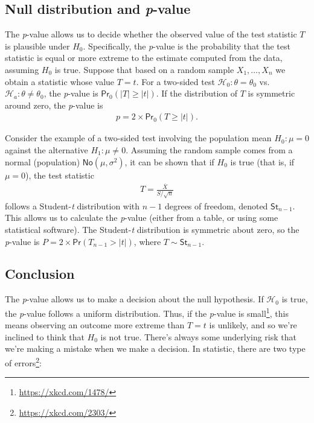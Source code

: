 \documentclass[
  11pt,
  letterpaper,
]{book}
\renewcommand{\href}[2]{#2\footnote{\url{#1}}}
\theoremstyle{definition}
\theoremstyle{definition}
\theoremstyle{definition}
\theoremstyle{remark}
\begin{document}
\hypertarget{null-distribution-and-p-value}{%
\subsection{\texorpdfstring{Null distribution and \emph{p}-value}{Null distribution and p-value}}\label{null-distribution-and-p-value}}

The \emph{p}-value allows us to decide whether the observed value of the test statistic \(T\) is plausible under \(H_0\). Specifically, the \emph{p}-value is the probability that the test statistic is equal or more extreme to the estimate computed from the data, assuming \(H_0\) is true. Suppose that based on a random sample \(X_1, \ldots, X_n\) we obtain a statistic whose value \(T=t\). For a two-sided test \(\mathscr{H}_0:\theta=\theta_0\) vs.~\(\mathscr{H}_a:\theta \neq \theta_0\), the \emph{p}-value is \(\mathsf{Pr}_0(|T| \geq |t|)\). If the distribution of \(T\) is symmetric around zero, the \emph{p}-value is
\begin{align*}
p = 2 \times \mathsf{Pr}_0(T \geq |t|).
\end{align*}

Consider the example of a two-sided test involving the population mean \(H_0:\mu=0\) against the alternative \(H_1:\mu \neq 0\). Assuming the random sample comes from a normal (population) \(\mathsf{No}(\mu, \sigma^2)\), it can be shown that if \(H_0\) is true (that is, if \(\mu=0\)), the test statistic
\begin{align*}
T = \frac{\overline{X}}{S/\sqrt{n}}
\end{align*}
follows a Student-\emph{t} distribution with \(n-1\) degrees of freedom, denoted \(\mathsf{St}_{n-1}\). This allows us to calculate the \emph{p}-value (either from a table, or using some statistical software). The Student-\emph{t} distribution is symmetric about zero, so the \emph{p}-value is \(P = 2\times\mathsf{Pr}(T_{n-1} > |t|)\), where \(T \sim \mathsf{St}_{n-1}\).

\hypertarget{conclusion}{%
\subsection{Conclusion}\label{conclusion}}

The \emph{p}-value allows us to make a decision about the null hypothesis. If \(\mathscr{H}_0\) is true, the \emph{p}-value follows a uniform distribution. \href{https://xkcd.com/1478/}{Thus, if the \emph{p}-value is small}, this means observing an outcome more extreme than \(T=t\) is unlikely, and so we're inclined to think that \(H_0\) is not true. There's always some underlying risk that we're making a mistake when we make a decision. In statistic, there are \href{https://xkcd.com/2303/}{two type of errors}:
\end{document}
